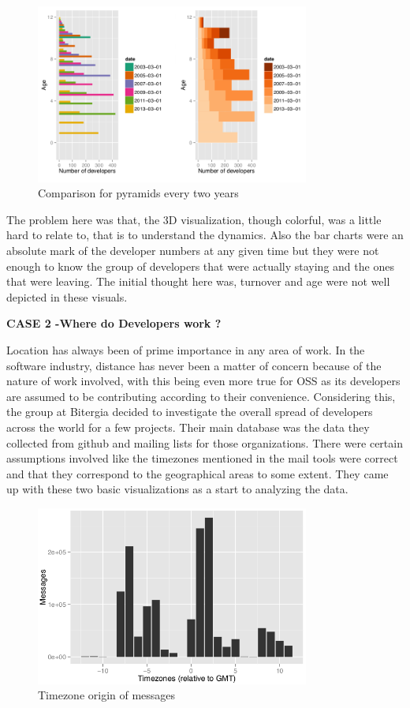 \documentclass[seploa]{beavtex}
\begin{document}
\begin{figure}[!ht]
\centering
\includegraphics[width=90mm]{age1.png}
\caption{Comparison for pyramids every two years}
\end{figure}

The problem here was that, the 3D visualization, though colorful, was a little hard to relate to, that is to understand the dynamics. Also the bar charts were an absolute mark of the developer numbers at any given time but they were not enough to know the group of developers that were actually staying and the ones that were leaving. The initial thought here was, turnover and age were not well depicted in these visuals.

 \textbf{CASE 2 -Where do Developers work ?}

Location has always been of prime importance in any area of work. In the software industry, distance has never been a matter of concern because of the nature of work involved, with this being even more true for OSS as its developers are assumed to be contributing according to their convenience\cite{yuri2010}. Considering this, the group at Bitergia decided to investigate the overall spread of developers across the world for a few projects. Their main database was the data they collected from github and mailing lists for those organizations. There were certain assumptions involved like the timezones mentioned in the mail tools were correct and that they correspond to the geographical areas to some extent. They came up with these two basic visualizations as a start to analyzing the data.

\begin{figure}[!ht]
\centering
\includegraphics[width=90mm]{work1.png}
\caption{Timezone origin of messages}
\end{figure}
\end{document}
